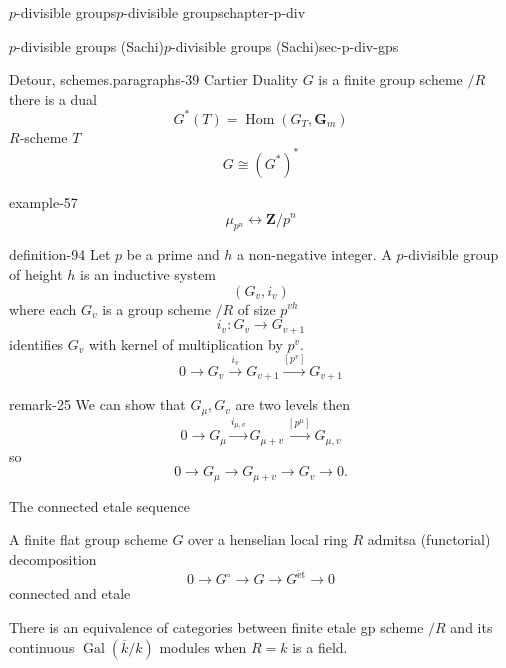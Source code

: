 \documentclass[oneside,10pt,]{book}
\numberwithin{equation}{section}
\newcommand{\ZZ}{\mathbf{Z}}
\newcommand{\et}{\mathrm{\acute{e}t}}
\DeclareMathOperator{\Hom}{Hom}
\newcommand{\absgal}[1]{\operatorname{Gal}(\overline{#1}/#1)}
\begin{document}
\begin{chapterptx}{\(p\)-divisible groups}{}{\(p\)-divisible groups}{}{}{chapter-p-div}
\begin{sectionptx}{\(p\)-divisible groups (Sachi)}{}{\(p\)-divisible groups (Sachi)}{}{}{sec-p-div-gps}
\begin{paragraphs}{Detour, schemes.}{paragraphs-39}
Cartier Duality \(G\) is a finite group scheme \(/R\) there is a dual%
\begin{equation*}
G^* (T) = \Hom (G_T, \mathbf G_m)
\end{equation*}
\(R\)-scheme \(T\)%
\begin{equation*}
G \cong (G^*)^*
\end{equation*}
%
\begin{example}{}{example-57}%
\hypertarget{p-1000}{}%
%
\begin{equation*}
\mu_{p^n} \leftrightarrow \ZZ/p^n
\end{equation*}
%
\end{example}
\begin{definition}{}{definition-94}%
\hypertarget{p-1001}{}%
Let \(p\) be a prime and \(h\) a non-negative integer. A \(p\)-divisible group of height \(h\) is an inductive system%
\begin{equation*}
(G_v, i_v)
\end{equation*}
where each \(G_v\) is a group scheme \(/R\) of size \(p^{vh}\)%
\begin{equation*}
i_v \colon G_v \to G_{v+1}
\end{equation*}
identifies \(G_v\) with kernel of multiplication by \(p^v\).%
\begin{equation*}
0 \to G_v \xrightarrow{i_v} G_{v+1} \xrightarrow{[p^v]} G_{v+1}
\end{equation*}
%
\end{definition}
\begin{remark}{}{remark-25}%
\hypertarget{p-1002}{}%
We can show that \(G_\mu,G_v\) are two levels then%
\begin{equation*}
0 \to G_\mu \xrightarrow{i_{\mu, v}} G_{\mu +v } \xrightarrow{[p^\mu]} G_{\mu,v}
\end{equation*}
so%
\begin{equation*}
0 \to G_\mu \to G_{\mu + v}  \to G_v \to 0\text{.}
\end{equation*}
%
\end{remark}
\hypertarget{p-1003}{}%
The connected etale sequence%
\par
\hypertarget{p-1004}{}%
A finite flat group scheme \(G\) over a henselian local ring \(R\) admitsa (functorial) decomposition%
\begin{equation*}
0  \to G^\circ \to G \to G^\et \to 0
\end{equation*}
connected and etale%
\par
\hypertarget{p-1005}{}%
There is an equivalence of categories between finite etale gp scheme \(/R\) and its continuous \(\absgal k\) modules when \(R = k\) is a field.%

\end{paragraphs}
\end{sectionptx}
\end{chapterptx}
\end{document}
